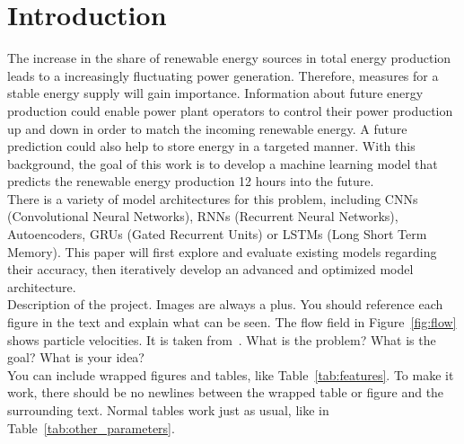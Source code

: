 \documentclass[11pt,table]{article}
\begin{document}
\newpage

\tableofcontents

\newpage


\section{Introduction}

The increase in the share of renewable energy sources in total energy production leads to a increasingly fluctuating power generation. Therefore, measures for a stable energy supply will gain importance. Information about future energy production could enable power plant operators to control their power production up and down in order to match the incoming renewable energy. A future prediction could also help to store energy in a targeted manner. 
With this background, the goal of this work is to develop a machine learning model that predicts the renewable energy production 12 hours into the future.\\
There is a variety of model architectures for this problem, including CNNs (Convolutional Neural Networks), RNNs (Recurrent Neural Networks), Autoencoders, GRUs (Gated Recurrent Units) or LSTMs (Long Short Term Memory). This paper will first explore and evaluate existing models regarding their accuracy, then iteratively develop an advanced and optimized model architecture.\\

Description of the project. Images are always a plus. You should reference each figure in the text and explain what can be seen. The flow field in Figure~\ref{fig:flow} shows particle velocities. It is taken from~\cite{Author2020}. What is the problem? What is the goal? What is your idea?\\ 


You can include wrapped figures and tables, like Table~\ref{tab:features}. To make it work, there should be no newlines between the wrapped table or figure and the surrounding text. Normal tables work just as usual, like in Table~\ref{tab:other_parameters}.\\
\end{document}

